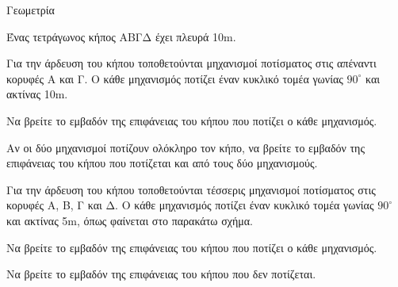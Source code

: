 \begin{ylh}
    \item Γεωμετρία
\end{ylh}

Ένας τετράγωνος κήπος ΑΒΓΔ έχει πλευρά 10m.

\begin{alist}
    \item Για την άρδευση του κήπου τοποθετούνται μηχανισμοί ποτίσματος στις απέναντι κορυφές Α και Γ. Ο κάθε μηχανισμός ποτίζει έναν κυκλικό τομέα γωνίας $90^\circ$ και ακτίνας 10m.
    \begin{rlist}
        \item Να βρείτε το εμβαδόν της επιφάνειας του κήπου που ποτίζει ο κάθε μηχανισμός. 
        \item Αν οι δύο μηχανισμοί ποτίζουν ολόκληρο τον κήπο, να βρείτε το εμβαδόν της επιφάνειας του κήπου που ποτίζεται και από τους δύο μηχανισμούς. 
    \end{rlist}
    
    \item Για την άρδευση του κήπου τοποθετούνται τέσσερις μηχανισμοί ποτίσματος στις κορυφές Α, Β, Γ και Δ. Ο κάθε μηχανισμός ποτίζει έναν κυκλικό τομέα γωνίας $90^\circ$ και ακτίνας 5m, όπως φαίνεται στο παρακάτω σχήμα.
    
    \begin{figure}
    \centering
    \end{figure}
    
    \begin{rlist}
        \item Να βρείτε το εμβαδόν της επιφάνειας του κήπου που ποτίζει ο κάθε μηχανισμός. 
        \item Να βρείτε το εμβαδόν της επιφάνειας του κήπου που δεν ποτίζεται. 
    \end{rlist}
    
\end{alist}